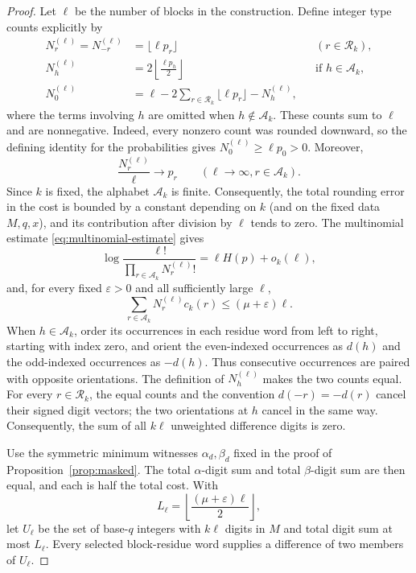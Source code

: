 \documentclass[11pt]{article}
\begin{document}
\begin{proof}
Let $\ell$ be the number of blocks in the construction.  Define integer
type counts explicitly by
\begin{align*}
 N_r^{(\ell)}=N_{-r}^{(\ell)}&=\lfloor\ell p_r\rfloor
       &&(r\in\mathcal R_k),\\
 N_h^{(\ell)}&=2\left\lfloor\frac{\ell p_h}{2}\right\rfloor
       &&\text{if $h\in\mathcal A_k$},\\
 N_0^{(\ell)}&=\ell-2\sum_{r\in\mathcal R_k}
                    \lfloor\ell p_r\rfloor-N_h^{(\ell)},
\end{align*}
where the terms involving $h$ are omitted when $h\notin\mathcal A_k$.
These counts sum to $\ell$ and are nonnegative.  Indeed, every nonzero count
was rounded downward, so the defining identity for the probabilities gives
$N_0^{(\ell)}\ge\ell p_0>0$.  Moreover,
\[
 \frac{N_r^{(\ell)}}{\ell}\longrightarrow p_r
 \qquad(\ell\to\infty, r\in\mathcal A_k).
\]
Since $k$ is fixed, the alphabet $\mathcal A_k$ is finite.  Consequently,
the total rounding error in the cost is bounded by a constant depending on
$k$ (and on the fixed data $M,q,x$), and its contribution after division by
$\ell$ tends to zero.  The multinomial estimate
\eqref{eq:multinomial-estimate} gives
\begin{equation}\label{eq:controlled-mult}
 \log\frac{\ell!}{\prod_{r\in\mathcal A_k}N_r^{(\ell)}!}
 =\ell H(p)+o_k(\ell),
\end{equation}
and, for every fixed $\varepsilon>0$ and all sufficiently large $\ell$,
\[
 \sum_{r\in\mathcal A_k}N_r^{(\ell)}c_k(r)
 \le(\mu+\varepsilon)\ell.
\]
When $h\in\mathcal A_k$, order its occurrences in each residue word from
left to right, starting with index zero, and orient the even-indexed
occurrences as $d(h)$ and the odd-indexed occurrences as $-d(h)$.  Thus
consecutive occurrences are paired with opposite orientations.  The
definition of $N_h^{(\ell)}$ makes the two counts equal.  For
every $r\in\mathcal R_k$, the equal counts and the convention
$d(-r)=-d(r)$ cancel their signed digit vectors; the two orientations at
$h$ cancel in the same way.  Consequently, the sum of all $k\ell$ unweighted
difference digits is zero.

Use the symmetric minimum witnesses $\alpha_d,\beta_d$ fixed in the proof of
Proposition~\ref{prop:masked}.  The total $\alpha$-digit sum and total
$\beta$-digit sum are then equal, and each is half the total cost.  With
\[
 L_\ell=\left\lfloor\frac{(\mu+\varepsilon)\ell}{2}\right\rfloor,
\]
let $U_\ell$ be the set of base-$q$ integers with $k\ell$ digits in $M$ and
total digit sum at most $L_\ell$.  Every selected block-residue word supplies
a difference of two members of $U_\ell$.


\end{proof}
\end{document}
